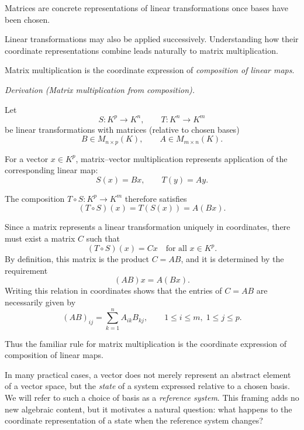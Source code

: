\medskip

Matrices are concrete representations of linear transformations once bases have been chosen.

\medskip

Linear transformations may also be applied successively.
Understanding how their coordinate representations combine
leads naturally to matrix multiplication.

\medskip

Matrix multiplication is the coordinate expression of \emph{composition of linear maps}.

\medskip

\textit{Derivation (Matrix multiplication from composition).}

\medskip

Let
\[
S : K^p \longrightarrow K^n,
\qquad
T : K^n \longrightarrow K^m
\]
be linear transformations with matrices (relative to chosen bases)
\[
B \in M_{n\times p}(K),
\qquad
A \in M_{m\times n}(K).
\]

For a vector $x \in K^p$, matrix--vector multiplication represents
application of the corresponding linear map:
\[
S(x)=Bx,
\qquad
T(y)=Ay.
\]

The composition $T\circ S : K^p \to K^m$ therefore satisfies
\[
(T\circ S)(x)=T(S(x))=A(Bx).
\]

Since a matrix represents a linear transformation uniquely in coordinates,
there must exist a matrix $C$ such that
\[
(T\circ S)(x)=Cx
\quad \text{for all } x\in K^p.
\]
By definition, this matrix is the product $C=AB$, and it is determined by
the requirement
\[
(AB)x=A(Bx).
\]
Writing this relation in coordinates shows that the entries of $C=AB$
are necessarily given by
\[
(AB)_{ij}
=
\sum_{k=1}^{n} A_{ik} B_{kj},
\qquad
1\le i\le m,\; 1\le j\le p.
\]

Thus the familiar rule for matrix multiplication is the coordinate expression of composition of linear maps.

\medskip


In many practical cases, a vector does not merely represent an abstract element of a
vector space, but the \emph{state} of a system expressed relative to a chosen basis.
We will refer to such a choice of basis as a \emph{reference system}.
This framing adds no new algebraic content, but it motivates a natural question:
what happens to the coordinate representation of a state when the reference
system changes?


